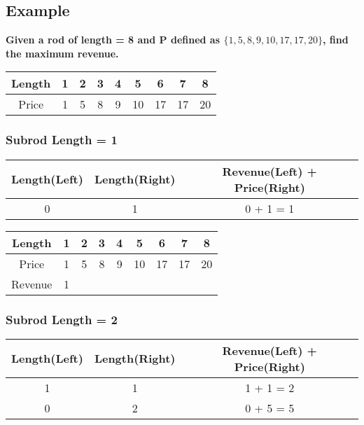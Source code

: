 \subsection{Example}
\textbf{Given a rod of length = 8 and P defined as $\{ 1, 5, 8, 9, 10, 17, 17, 20 \}$, find the maximum revenue.}

\begin{table}[H]
	\centering
	\begin{tabular}{| c | c | c | c | c | c | c | c | c |}
		\hline
		Length
			&	1
			&	2
			&	3
			&	4
			&	5
			&	6
			&	7
			&	8\\
		\hline
		Price
			&	1
			&	5
			&	8
			&	9
			&	10
			&	17
			&	17
			&	20\\
		\hline
	\end{tabular}
\end{table}

\subsubsection*{Subrod Length = 1}

\begin{table}[h]
	\centering
	\begin{tabular}{| c | c | c |}
		\hline
		Length(Left)	&	Length(Right)	&	Revenue(Left) + Price(Right)\\
		\hline
		0
			&	1
			&	0 + 1 = 1\\
		\hline
	\end{tabular}	
\end{table}

\begin{table}[H]
	\centering
	\begin{tabular}{| c | c | c | c | c | c | c | c | c |}
		\hline
		Length
		&	1
		&	2
		&	3
		&	4
		&	5
		&	6
		&	7
		&	8\\
		\hline
		Price
		&	1
		&	5
		&	8
		&	9
		&	10
		&	17
		&	17
		&	20\\
		\hline
		Revenue
		&	1
		&	
		&	
		&
		&	
		&	
		&	
		&	\\
		\hline
	\end{tabular}
\end{table}

\subsubsection*{Subrod Length = 2}

\begin{table}[h]
	\centering
	\begin{tabular}{| c | c | c |}
		\hline
		Length(Left)	&	Length(Right)	&	Revenue(Left) + Price(Right)\\
		\hline
		1
			&	1
			&	1 + 1 = 2\\
		\hline
		0	
			&	2
			&	0 + 5 = 5\\
		\hline
	\end{tabular}	
\end{table}

